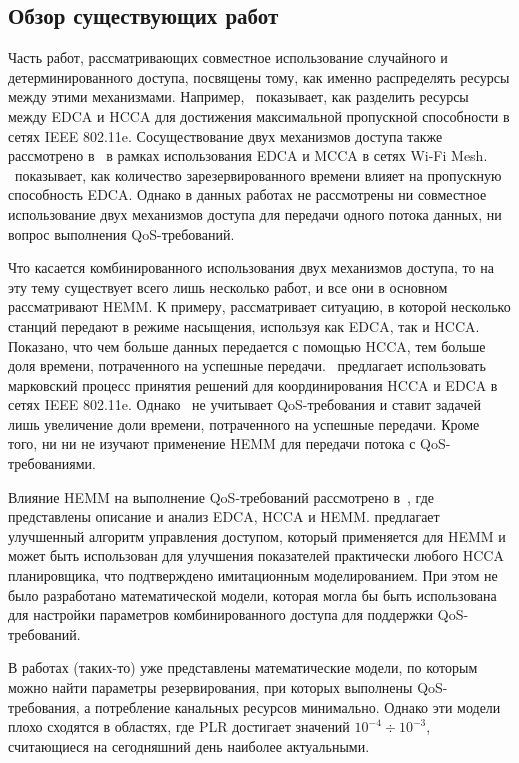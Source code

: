 \subsection{Обзор существующих работ}
\label{sec:related_papers}

Часть работ, рассматривающих совместное использование случайного и детерминированного доступа, посвящены тому, как именно распределять ресурсы между этими механизмами. Например,~\cite{siris2006resource} показывает, как разделить ресурсы между EDCA и HCCA для достижения максимальной пропускной способности в сетях IEEE 802.11e. Сосуществование двух механизмов доступа также рассмотрено в~\cite{Krasilov2013} в рамках использования EDCA и MCCA в сетях Wi-Fi Mesh. \cite{Krasilov2013}~показывает, как количество зарезервированного времени влияет на пропускную способность EDCA. Однако в данных работах не рассмотрены ни совместное использование двух механизмов доступа для передачи одного потока данных, ни вопрос выполнения QoS-требований. 

Что касается комбинированного использования двух механизмов доступа, то на эту тему существует всего лишь несколько работ, и все они в основном рассматривают HEMM. К примеру, \cite{kuan2007utilization} рассматривает ситуацию, в которой несколько станций передают в режиме насыщения, используя как EDCA, так и HCCA. Показано, что чем больше данных передается с помощью HCCA, тем больше доля времени, потраченного на успешные передачи. \cite{Ng2012}~предлагает использовать марковский процесс принятия решений для координирования HCCA и EDCA в сетях  IEEE 802.11e. Однако \cite{Ng2012}~не учитывает QoS-требования и ставит задачей лишь увеличение доли времени, потраченного на успешные передачи. Кроме того, ни  \cite{kuan2007utilization} ни \cite{Ng2012} не изучают применение HEMM для передачи потока с QoS-требованиями.

Влияние HEMM на выполнение QoS-требований рассмотрено в~\cite{ruscelli2012enhancement}, где представлены описание и анализ EDCA, HCCA и HEMM. \cite{ruscelli2012enhancement} предлагает улучшенный алгоритм управления доступом, который применяется для HEMM и может быть использован для улучшения показателей практически любого HCCA планировщика, что подтверждено имитационным моделированием. При этом не было разработано математической модели, которая могла бы быть использована для настройки параметров комбинированного доступа для поддержки QoS-требований.

В работах (таких-то) уже представлены математические модели, по которым можно найти параметры резервирования, при которых выполнены QoS-требования, а потребление канальных ресурсов минимально. Однако эти модели плохо сходятся в областях, где PLR достигает значений $10^{-4} \div 10^{-3}$, считающиеся на сегодняшний день наиболее актуальными.